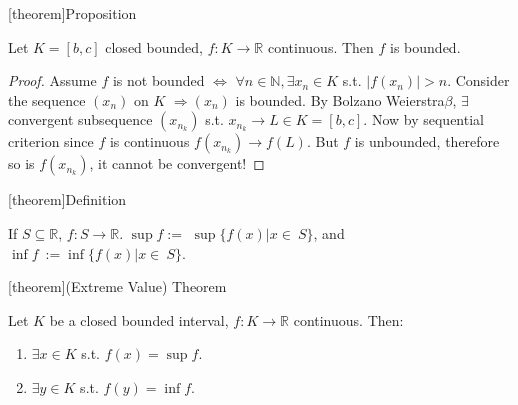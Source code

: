\documentclass[12pt]{report}
\theoremstyle{definition}
\begin{document}
[theorem]{Proposition}
\begin{sequence is bounded in closed bounded continuous func}
    Let $K = [b,c]$ closed bounded, $f:K\rightarrow{}\mathbb{R}$ continuous.
    Then $f$ is bounded.
\end{sequence is bounded in closed bounded continuous func}

\begin{proof}
    Assume $f$ is not bounded $\iff$
    $\forall n \in \mathbb{N}, \exists x_n \in K$ s.t. $|f(x_n)|>n$.
    Consider the sequence $(x_n)$ on $K$ $\Rightarrow{}(x_n)$ is bounded.
    By Bolzano Weierstra$\beta$, $\exists$ convergent subsequence $(x_{n_k})$
    s.t. $x_{n_k} \rightarrow{} L \in K = [b,c]$.
    Now by sequential criterion since $f$ is continuous $f(x_{n_k}) \rightarrow{}f(L)$.
    But $f$ is unbounded, therefore so is $f(x_{n_k})$, it cannot be convergent!
\end{proof}

[theorem]{Definition}
\begin{supremum of function}
    If $S \subseteq \mathbb{R}$, $f:S\rightarrow{}\mathbb{R}$.
    $\sup{f} :=$ $ \sup{\{f(x) | x \in\ S\}}$,
    and $\inf{f}\ := \inf{\{ f(x) | x \in\ S\}}$.
\end{supremum of function}

[theorem]{(Extreme Value) Theorem}
\begin{closed bounded interval func has sup}
    Let $K$ be a closed bounded interval, $f:K\rightarrow{}\mathbb{R}$ continuous. Then:
    \begin{enumerate}[label = (\arabic*)]
        \item $\exists x \in K$ s.t. $f(x) = \sup{f}$.
        \item $\exists y \in K$ s.t. $f(y) = \inf{f}$.
    \end{enumerate}
    
\end{closed bounded interval func has sup}
\end{document}
